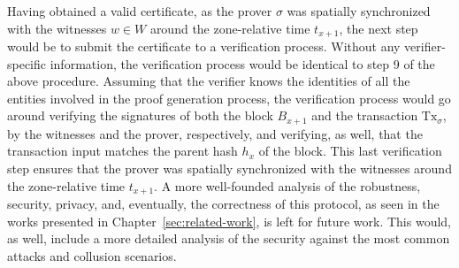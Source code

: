 Having obtained a valid \pol{} certificate, as the prover $\sigma$ was spatially synchronized with the witnesses $w \in W$ around the zone-relative time $t_{x+1}$, the next step would be to submit the certificate to a verification process. Without any verifier-specific information, the verification process would be identical to step 9 of the above procedure. Assuming that the verifier knows the identities of all the entities involved in the proof generation process, the verification process would go around verifying the signatures of both the block $B_{x+1}$ and the transaction $\text{Tx}_\sigma$, by the witnesses and the prover, respectively, and verifying, as well, that the transaction input matches the parent hash $h_{x}$ of the block. This last verification step ensures that the prover was spatially synchronized with the witnesses around the zone-relative time $t_{x+1}$. A more well-founded analysis of the robustness, security, privacy, and, eventually, the correctness of this \pol{} protocol, as seen in the works presented in Chapter~\ref{sec:related-work}, is left for future work. This would, as well, include a more detailed analysis of the security against the most common attacks and collusion scenarios.

